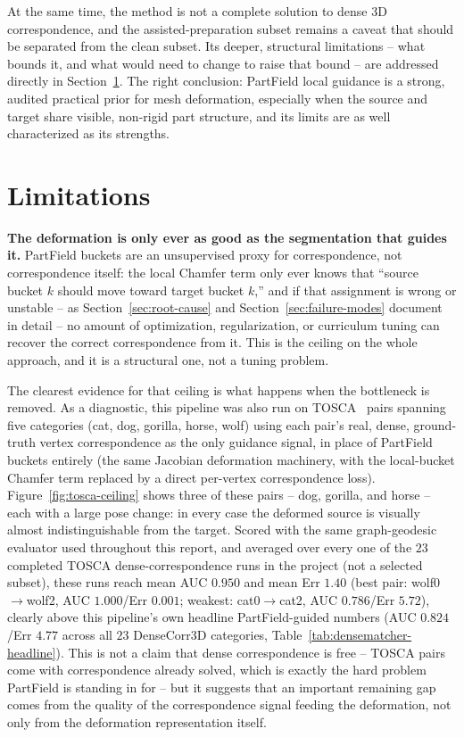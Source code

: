 \documentclass{article}
\begin{document}
At the same time, the method is not a complete solution to dense 3D correspondence, and the
assisted-preparation subset remains a caveat that should be separated from the clean subset.
Its deeper, structural limitations -- what bounds it, and what would need to change to raise that
bound -- are addressed directly in Section~\ref{sec:limitations}. The right conclusion: PartField local 
guidance is a strong, audited practical prior for mesh
deformation, especially when the source and target share visible, non-rigid part structure, and its
limits are as well characterized as its strengths.

\section{Limitations}
\label{sec:limitations}

\textbf{The deformation is only ever as good as the segmentation that guides it.} PartField buckets
are an unsupervised proxy for correspondence, not correspondence itself: the local Chamfer term
only ever knows that ``source bucket $k$ should move toward target bucket $k$,'' and if that
assignment is wrong or unstable -- as Section~\ref{sec:root-cause} and Section~\ref{sec:failure-modes}
document in detail -- no amount of optimization, regularization, or curriculum tuning can recover
the correct correspondence from it. This is the ceiling on the whole approach, and it is a
structural one, not a tuning problem.

The clearest evidence for that ceiling is what happens when the bottleneck is removed. As a
diagnostic, this pipeline was also run on TOSCA~\cite{tosca} pairs spanning five categories (cat,
dog, gorilla, horse, wolf) using each pair's real, dense, ground-truth vertex correspondence as the
only guidance signal, in place of PartField buckets entirely (the same Jacobian deformation
machinery, with the local-bucket Chamfer term replaced by a direct per-vertex correspondence loss).
Figure~\ref{fig:tosca-ceiling} shows three of these pairs -- dog, gorilla, and horse -- each with a
large pose change: in every case the deformed source is visually almost indistinguishable from the
target. Scored with the same graph-geodesic evaluator used throughout this report, and averaged over every
one of the $23$ completed TOSCA dense-correspondence runs in the project (not a selected subset),
these runs reach mean AUC $0.950$ and mean Err $1.40$ (best pair: wolf0$\to$wolf2, AUC
$1.000$/Err $0.001$; weakest: cat0$\to$cat2, AUC $0.786$/Err $5.72$), clearly above this pipeline's
own headline PartField-guided numbers (AUC $0.824$/Err $4.77$ across all $23$ DenseCorr3D
categories, Table~\ref{tab:densematcher-headline}). This is not a claim that dense correspondence
is free -- TOSCA pairs come with correspondence already solved, which is exactly the hard problem
PartField is standing in for -- but it suggests that an important remaining gap comes from the
quality of the correspondence signal feeding the deformation, not only from the deformation
representation itself.
\end{document}
